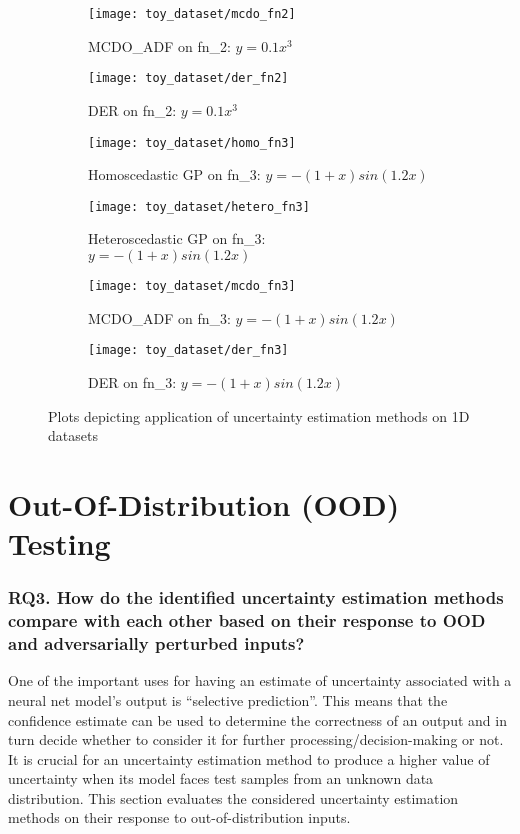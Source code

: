 \begin{figure}[H]\ContinuedFloat
	\centering
	\begin{subfigure}[b]{0.4\textwidth}
		\centering
		\texttt{[image: toy\_dataset/mcdo\_fn2]}
		\caption{MCDO\_ADF on fn\_2: $y=0.1x^3$}
		\label{mcdo_fn2}
	\end{subfigure}
	\hfill
	\begin{subfigure}[b]{0.4\textwidth}
		\centering
		\texttt{[image: toy\_dataset/der\_fn2]}
		\caption{DER on fn\_2: $y=0.1x^3$}
		\label{der_fn2}
	\end{subfigure}
	\hfill
	\begin{subfigure}[b]{0.4\textwidth}
		\centering
		\texttt{[image: toy\_dataset/homo\_fn3]}
		\caption{Homoscedastic GP on fn\_3: $y=-(1+x)sin(1.2x)$}
		\label{homo_fn3}
	\end{subfigure}
	\hfill
	\begin{subfigure}[b]{0.4\textwidth}
		\centering
		\texttt{[image: toy\_dataset/hetero\_fn3]}
		\caption{Heteroscedastic GP on fn\_3: $y=-(1+x)sin(1.2x)$}
		\label{hetero_fn3}
	\end{subfigure}
	\hfill
	\begin{subfigure}[b]{0.4\textwidth}
		\centering
		\texttt{[image: toy\_dataset/mcdo\_fn3]}
		\caption{MCDO\_ADF on fn\_3: $y=-(1+x)sin(1.2x)$}
		\label{mcdo_fn3}
	\end{subfigure}
	\hfill
	\begin{subfigure}[b]{0.4\textwidth}
		\centering
		\texttt{[image: toy\_dataset/der\_fn3]}
		\caption{DER on fn\_3: $y=-(1+x)sin(1.2x)$}
		\label{der_fn3}
	\end{subfigure}
	\hfill
	\caption{Plots depicting application of uncertainty estimation methods on 1D datasets}
	\label{fig_1d_functions}
\end{figure}


\vfill\section{Out-Of-Distribution (OOD) Testing}
\subsubsection{\textbf{RQ3.} How do the identified uncertainty estimation methods compare with each other based on their response to OOD and adversarially perturbed inputs?}
One of the important uses for having an estimate of uncertainty associated with a neural net model's output is \enquote{selective prediction}. This means that the confidence estimate can be used to determine the correctness of an output and in turn decide whether to consider it for further processing/decision-making or not. It is crucial for an uncertainty estimation method to produce a higher value of uncertainty when its model faces test samples from an unknown data distribution. This section evaluates the considered uncertainty estimation methods on their response to out-of-distribution inputs.
